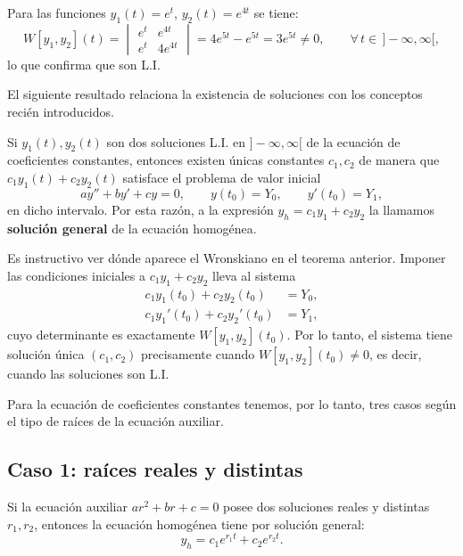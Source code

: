 \begin{example}
    Para las funciones $y_1(t)=e^{t}$, $y_2(t)=e^{4t}$ se tiene:
    \[
    W[y_1,y_2](t)=\begin{vmatrix}
        e^t & e^{4t}\\
        e^t & 4e^{4t}
    \end{vmatrix}=4e^{5t}-e^{5t}=3e^{5t}\neq 0,\qquad \forall\, t\in\, ]-\infty,\infty[,
    \]
    lo que confirma que son L.I.
\end{example}

El siguiente resultado relaciona la existencia de soluciones con los conceptos reci\'en introducidos.

\begin{theorem}
    Si $y_1(t),y_2(t)$ son dos soluciones L.I. en $]-\infty,\infty[$ de la ecuaci\'on de coeficientes constantes, entonces existen \'unicas constantes $c_1,c_2$ de manera que $c_1y_1(t)+c_2y_2(t)$ satisface el problema de valor inicial
    \[
    ay''+by'+cy=0,\qquad y(t_0)=Y_0,\qquad y'(t_0)=Y_1,
    \]
    en dicho intervalo. Por esta raz\'on, a la expresi\'on $y_h=c_1y_1+c_2y_2$ la llamamos \textbf{soluci\'on general} de la ecuaci\'on homog\'enea.
\end{theorem}

\begin{remark}
    Es instructivo ver d\'onde aparece el Wronskiano en el teorema anterior. Imponer las condiciones iniciales a $c_1y_1+c_2y_2$ lleva al sistema
    \begin{align*}
        c_1y_1(t_0)+c_2y_2(t_0)&=Y_0,\\
        c_1y_1'(t_0)+c_2y_2'(t_0)&=Y_1,
    \end{align*}
    cuyo determinante es exactamente $W[y_1,y_2](t_0)$. Por lo tanto, el sistema tiene soluci\'on \'unica $(c_1,c_2)$ precisamente cuando $W[y_1,y_2](t_0)\neq 0$, es decir, cuando las soluciones son L.I.
\end{remark}

Para la ecuaci\'on de coeficientes constantes tenemos, por lo tanto, tres casos seg\'un el tipo de ra\'ices de la ecuaci\'on auxiliar.

\subsection*{Caso 1: ra\'ices reales y distintas}

\begin{theorem}
    Si la ecuaci\'on auxiliar $ar^2+br+c=0$ posee dos soluciones reales y distintas $r_1,r_2$, entonces la ecuaci\'on homog\'enea tiene por soluci\'on general:
    \[
    y_h=c_1e^{r_1t}+c_2e^{r_2t}.
    \]
\end{theorem}

